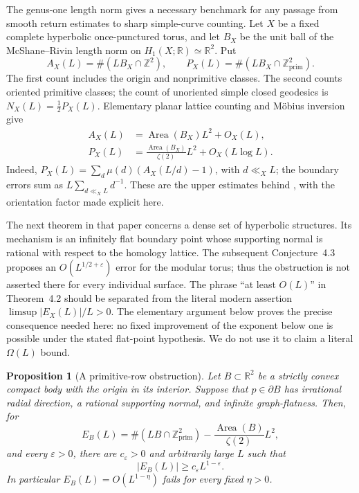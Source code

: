 \documentclass[11pt,a4paper]{article}
\numberwithin{equation}{section}
\newtheorem{proposition}[theorem]{Proposition}
\theoremstyle{definition}
\theoremstyle{remark}
\newcommand{\RR}{\mathbb R}
\newcommand{\ZZ}{\mathbb Z}
\begin{document}
The genus-one length norm gives a necessary benchmark for any passage from
smooth return estimates to sharp simple-curve counting. Let $X$ be a fixed
complete hyperbolic once-punctured torus, and let $B_X$ be the unit ball of
the McShane--Rivin length norm on $H_1(X;\RR)\simeq\RR^2$. Put
\[
 A_X(L)=\#(LB_X\cap\ZZ^2),\qquad
 P_X(L)=\#(LB_X\cap\ZZ^2_{\mathrm{prim}}).
\]
The first count includes the origin and nonprimitive classes. The second
counts oriented primitive classes; the count of unoriented simple closed
geodesics is $N_X(L)=\tfrac12P_X(L)$. Elementary planar lattice counting
and M\"obius inversion give
\begin{align}
 A_X(L)&=\operatorname{Area}(B_X)L^2+O_X(L),\label{eq:normballall}\\
 P_X(L)&=\frac{\operatorname{Area}(B_X)}{\zeta(2)}L^2
           +O_X(L\log L).\label{eq:normballprimitive}
\end{align}
Indeed, $P_X(L)=\sum_d\mu(d)(A_X(L/d)-1)$, with $d\ll_X L$;
the boundary errors sum as $L\sum_{d\ll_X L}d^{-1}$. These are the
upper estimates behind \cite[Theorem~4.1]{McShaneRivinTori}, with the
orientation factor made explicit here.

The next theorem in that paper concerns a dense set of hyperbolic
structures. Its mechanism is an infinitely flat boundary point whose
supporting normal is rational with respect to the homology lattice.
The subsequent Conjecture~4.3 proposes an $O(L^{1/2+\varepsilon})$ error
for the modular torus; thus the obstruction is not asserted there for
every individual surface. The phrase ``at least $O(L)$'' in Theorem~4.2
should be separated from the literal modern assertion
$\limsup|E_X(L)|/L>0$. The elementary argument below proves the precise
consequence needed here: no fixed improvement of the exponent below one
is possible under the stated flat-point hypothesis. We do not use it to
claim a literal $\Omega(L)$ bound.

\begin{proposition}[A primitive-row obstruction]
\label{prop:normballflatrow}
Let $B\subset\RR^2$ be a strictly convex compact body with the origin
in its interior. Suppose that $p\in\partial B$ has irrational radial
direction, a rational supporting normal, and infinite graph-flatness.
Then, for
\[
 E_B(L)=\#(LB\cap\ZZ^2_{\mathrm{prim}})
       -\frac{\operatorname{Area}(B)}{\zeta(2)}L^2,
\]
and every $\varepsilon>0$, there are $c_\varepsilon>0$ and arbitrarily
large $L$ such that
\begin{equation}
 |E_B(L)|\geq c_\varepsilon L^{1-\varepsilon}.
 \label{eq:normballlowerpower}
\end{equation}
In particular $E_B(L)=O(L^{1-\eta})$ fails for every fixed $\eta>0$.
\end{proposition}
\end{document}
